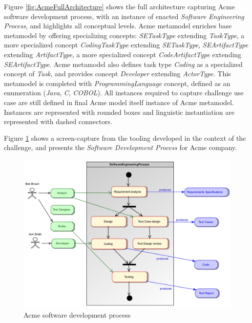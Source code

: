 Figure \ref{fig:AcmeFullArchitecture} shows the full architecture capturing Acme software development process, with an instance of enacted \textit{Software Engineering Process}, and highlights all conceptual levels. Acme metamodel enriches base metamodel by offering specializing concepts: \textit{SETaskType} extending \textit{TaskType}, a more specialized concept \textit{CodingTaskType} extending \textit{SETaskType}, \textit{SEArtifactType} extending \textit{ArtifactType}, a more specialized concept \textit{CodeArtifactType} extending \textit{SEArtifactType}. Acme metamodel also defines task type \textit{Coding} as a specialized concept of \textit{Task}, and provides concept \textit{Developer} extending \textit{ActorType}. This metamodel is completed with \textit{ProgrammingLanguage} concept, defined as an enumeration (\textit{Java}, \textit{C}, \textit{COBOL}). All instances required to capture challenge use case are still defined in final Acme model itself instance of Acme metamodel. Instances are represented with rounded boxes and linguistic instantiation are represented with dashed connectors.

Figure \ref{fig:AcmeSoftwareDevelopmentProcess} shows a screen-capture from the tooling developed in the context of the challenge, and presents the \textit{Software Development Process} for Acme company. 

\begin{figure}
 \centering
    \includegraphics[width=1.0 \columnwidth]{Figures/SoftwareEngineeringProcessCroped.pdf}
     \caption{Acme software development process}
    \label{fig:AcmeSoftwareDevelopmentProcess}
\end{figure}

